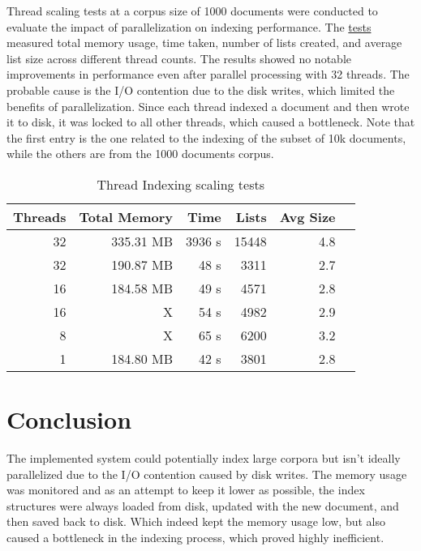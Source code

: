 Thread scaling tests at a corpus size of 1000 documents were conducted to evaluate the impact of parallelization on indexing performance. The \hyperref[tab:threads]{tests} measured total memory usage, time taken, number of lists created, and average list size across different thread counts. The results showed no notable improvements in performance even after parallel processing with 32 threads. The probable cause is the I/O contention due to the disk writes, which limited the benefits of parallelization. Since each thread indexed a document and then wrote it to disk, it was locked to all other threads, which caused a bottleneck. Note that the first entry is the one related to the indexing of the subset of 10k documents, while the others are from the 1000 documents corpus.

\begin{table}[htbp] \label{tab:threads} \centering
  \caption{Thread Indexing scaling tests}
  \begin{tabular}{rrrrrr}
    \toprule
    \textbf{Threads} & \textbf{Total Memory} & \textbf{Time} & \textbf{Lists} & \textbf{Avg Size} \\
    \midrule
    32               & 335.31 MB             & 3936 s        & 15448          & 4.8               \\ %
    32               & 190.87 MB             & 48 s          & 3311           & 2.7               \\
    16               & 184.58 MB             & 49 s          & 4571           & 2.8               \\
    16               & X                     & 54 s          & 4982           & 2.9               \\
    8                & X                     & 65 s          & 6200           & 3.2               \\
    1                & 184.80 MB             & 42 s          & 3801           & 2.8               \\
    \bottomrule
  \end{tabular}
\end{table}

\section{Conclusion}

The implemented system could potentially index large corpora but isn't ideally parallelized due to the I/O contention caused by disk writes. The memory usage was monitored and as an attempt to keep it lower as possible, the index structures were always loaded from disk, updated with the new document, and then saved back to disk. Which indeed kept the memory usage low, but also caused a bottleneck in the indexing process, which proved highly inefficient.

